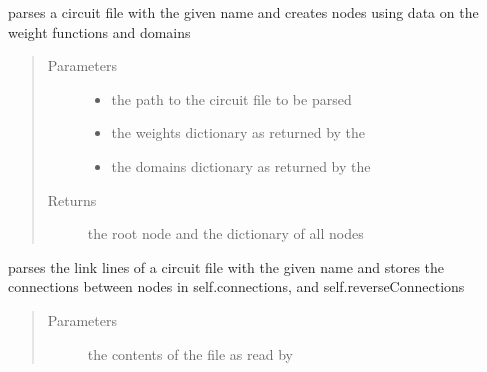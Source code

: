 \documentclass[letterpaper,10pt,english,openany,oneside]{sphinxmanual}
\begin{document}
\begin{fulllineitems}
\begin{fulllineitems}
\end{fulllineitems}


\begin{fulllineitems}
\label{\detokenize{index:parser.Parser.parseCircuit}}
parses a circuit file with the given name and creates nodes using data on the weight functions and domains
\begin{quote}\begin{description}
\item[{Parameters}] \leavevmode\begin{itemize}
\item {} 
 \textendash{} the path to the circuit file to be parsed

\item {} 
 \textendash{} the weights dictionary as returned by the {\hyperref[\detokenize{index:parser.Parser.parseWeights}]{}}

\item {} 
 \textendash{} the domains dictionary as returned by the {\hyperref[\detokenize{index:parser.Parser.parseWeights}]{}}

\end{itemize}

\item[{Returns}] \leavevmode
the root node and the dictionary of all nodes

\end{description}\end{quote}

\end{fulllineitems}


\begin{fulllineitems}
\label{\detokenize{index:parser.Parser.parseConnections}}
parses the link lines of a circuit file with the given name and stores the connections between nodes in self.connections, 
and self.reverseConnections
\begin{quote}\begin{description}
\item[{Parameters}] \leavevmode
{} \textendash{} the contents of the file as read by {\hyperref[\detokenize{index:parser.Parser.parseCircuit}]{}}


\end{description}
\end{quote}
\end{fulllineitems}
\end{fulllineitems}
\end{document}
